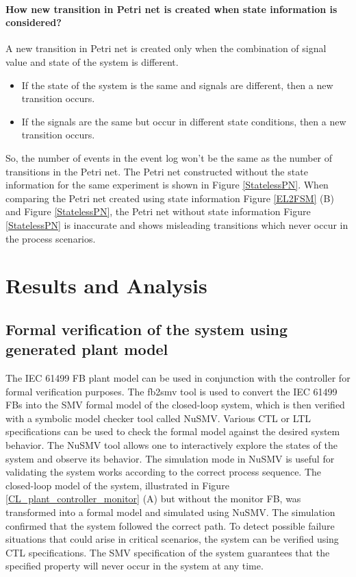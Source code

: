 \documentclass{ieeeojies}
\begin{document}
\paragraph{How new transition in Petri net is created when state information is considered?}

A new transition in Petri net is created only when the combination of signal value and state of the system is different. 

\begin{itemize}
  \item If the state of the system is the same and signals are different, then a new transition occurs.
  \item If the signals are the same but  occur 
  in different state conditions, then  a new transition occurs.
\end{itemize}

So, the number of events in the event log won't be the same as the number of transitions in the Petri net. The Petri net constructed without the state information for the same experiment is shown in  Figure \ref{StatelessPN}. When comparing the Petri net created using state information Figure \ref{EL2FSM} (B) and Figure \ref{StatelessPN}, the Petri net without state information Figure  \ref{StatelessPN} is inaccurate and shows misleading transitions which never occur in the process scenarios.

\section{Results and Analysis}

\subsection{Formal verification of the system using generated plant model}

The IEC 61499 FB plant model can be used in conjunction with the controller for formal verification purposes. The fb2smv tool is used to convert the IEC 61499 FBs into the SMV formal model of the closed-loop system, which is then verified with a symbolic model checker tool called NuSMV. Various CTL or LTL specifications can be used to check the formal model against the desired system behavior. The NuSMV tool allows one to interactively explore the states of the system and observe its behavior. The simulation mode in NuSMV is useful for validating the system works according to the correct process sequence. The closed-loop model of the system, illustrated in Figure \ref{CL_plant_controller_monitor}  (A) but without the monitor FB, was transformed into a formal model and simulated using NuSMV. The simulation confirmed that the system followed the correct path. To detect possible failure situations that could arise in critical scenarios, the system can be verified using CTL specifications. The SMV specification of the system guarantees that the specified property will never occur in the system at any time.
\end{document}
